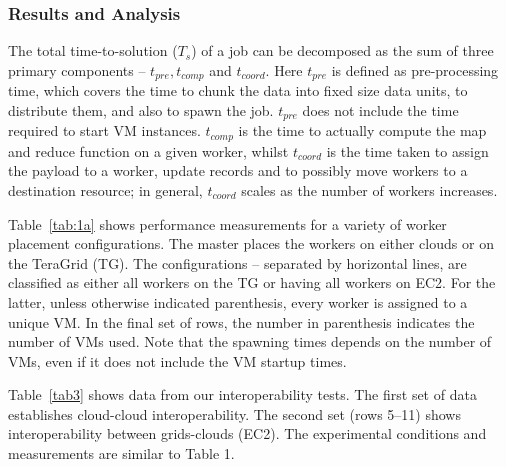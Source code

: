 \documentclass[3p,twocolumn]{elsarticle}
\begin{document}
\subsubsection*{Results and Analysis}

The total time-to-solution ($T_s$) of a \sagamapreduce job can be
decomposed as the sum of three primary components -- $t_{pre},
t_{comp}$ and $t_{coord}$.  Here $t_{pre}$ is defined as
pre-processing time, which covers the time to chunk the data into
fixed size data units, to distribute them, and also to spawn the job.
$t_{pre}$ does not include the time required to start VM instances.
$t_{comp}$ is the time to actually compute the map and reduce function
on a given worker, whilst $t_{coord}$ is the time taken to assign the
payload to a worker, update records and to possibly move workers to a
destination resource; in general, $t_{coord}$ scales as the number of
workers increases.

Table~\ref{tab:1a} shows performance measurements for a variety of
worker placement configurations.  The master places the workers on
either clouds or on the TeraGrid (TG). The configurations -- separated
by horizontal lines, are classified as either all workers on the TG or
having all workers on EC2. For the latter, unless otherwise indicated
parenthesis, every worker is assigned to a unique VM. In the final set
of rows, the number in parenthesis indicates the number of VMs used.
Note that the spawning times depends on the number of VMs, even if it
does not include the VM startup times.  


Table~\ref{tab3} shows data from our interoperability tests.  The
first set of data establishes cloud-cloud interoperability. The second
set (rows 5--11) shows interoperability between grids-clouds (EC2).
The experimental conditions and measurements are similar to Table 1.
\end{document}
